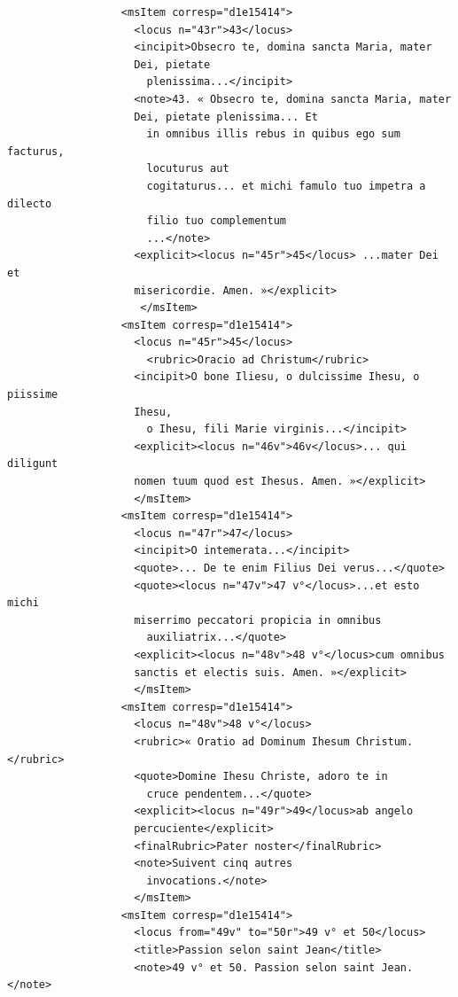 \documentclass[a4paper,12pt,twoside]{book}
\begin{document}
\begin{verbatim}
                  <msItem corresp="d1e15414">
                    <locus n="43r">43</locus>
                    <incipit>Obsecro te, domina sancta Maria, mater 
                    Dei, pietate
                      plenissima...</incipit>
                    <note>43. « Obsecro te, domina sancta Maria, mater
                    Dei, pietate plenissima... Et
                      in omnibus illis rebus in quibus ego sum facturus, 
                      locuturus aut
                      cogitaturus... et michi famulo tuo impetra a dilecto 
                      filio tuo complementum
                      ...</note>
                    <explicit><locus n="45r">45</locus> ...mater Dei et 
                    misericordie. Amen. »</explicit>
                     </msItem>
                  <msItem corresp="d1e15414">
                    <locus n="45r">45</locus>
                      <rubric>Oracio ad Christum</rubric>
                    <incipit>O bone Iliesu, o dulcissime Ihesu, o piissime 
                    Ihesu,
                      o Ihesu, fili Marie virginis...</incipit>
                    <explicit><locus n="46v">46v</locus>... qui diligunt
                    nomen tuum quod est Ihesus. Amen. »</explicit>
                    </msItem>
                  <msItem corresp="d1e15414">
                    <locus n="47r">47</locus>
                    <incipit>O intemerata...</incipit>
                    <quote>... De te enim Filius Dei verus...</quote>
                    <quote><locus n="47v">47 v°</locus>...et esto michi
                    miserrimo peccatori propicia in omnibus
                      auxiliatrix...</quote>
                    <explicit><locus n="48v">48 v°</locus>cum omnibus 
                    sanctis et electis suis. Amen. »</explicit>
                    </msItem>
                  <msItem corresp="d1e15414">
                    <locus n="48v">48 v°</locus>
                    <rubric>« Oratio ad Dominum Ihesum Christum.</rubric>
                    <quote>Domine Ihesu Christe, adoro te in
                      cruce pendentem...</quote>
                    <explicit><locus n="49r">49</locus>ab angelo 
                    percuciente</explicit>
                    <finalRubric>Pater noster</finalRubric>
                    <note>Suivent cinq autres
                      invocations.</note>
                    </msItem>
                  <msItem corresp="d1e15414">
                    <locus from="49v" to="50r">49 v° et 50</locus>
                    <title>Passion selon saint Jean</title>
                    <note>49 v° et 50. Passion selon saint Jean.</note>

\end{verbatim}
\end{document}
